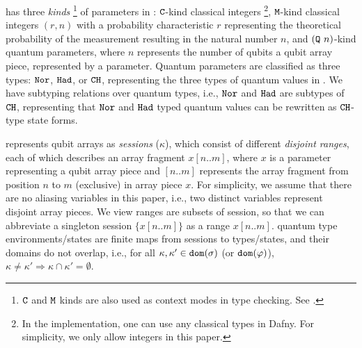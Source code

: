 \qafny has three \emph{kinds} \footnote{$\texttt{C}$ and $\texttt{M}$ kinds are also used as context modes in type checking. See . } of parameters in : $\texttt{C}$-kind classical integers \footnote{In the \qafny implementation, one can use any classical types in Dafny. For simplicity, we only allow integers in this paper.}, 
$\texttt{M}$-kind classical integers $(r,n)$ with a probability characteristic $r$ representing the theoretical probability of the measurement resulting in the natural number $n$, and $(\texttt{Q}~n)$-kind quantum parameters, where $n$ represents the number of qubits a qubit array piece, represented by a parameter. Quantum parameters are classified as three types: $\texttt{Nor}$, $\texttt{Had}$, or $\texttt{CH}$, representing the three types of quantum values in . We have subtyping relations over quantum types, i.e., $\texttt{Nor}$ and $\texttt{Had}$ are subtypes of $\texttt{CH}$, representing that $\texttt{Nor}$ and $\texttt{Had}$ typed quantum values can be rewritten as $\texttt{CH}$-type state forms. 

\qafny represents qubit arrays as \emph{sessions} ($\kappa$), which consist of different \emph{disjoint ranges}, each of which describes an array fragment $x[n..m]$, where $x$ is a parameter representing a qubit array piece and $[n..m]$ represents the array fragment from position $n$ to $m$ (exclusive) in array piece $x$. For simplicity, we assume that there are no aliasing variables in this paper, i.e., two distinct variables represent disjoint array pieces. We view ranges are subsets of session, so that we can abbreviate a singleton session $\{x[n..m]\}$ as a range $x[n..m]$.
\qafny quantum type environments/states are finite maps from sessions to types/states, and their domains do not overlap, i.e., for all $\kappa, \kappa' \in \mathtt{dom}(\sigma)$ (or $\mathtt{dom}(\varphi)$), $\kappa \neq \kappa' \Rightarrow \kappa \cap \kappa' = \emptyset$.

